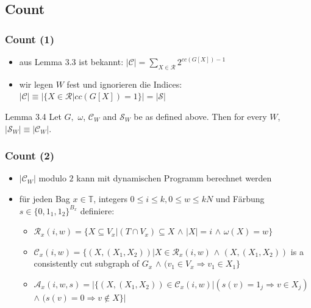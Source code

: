 \documentclass{beamer}
\begin{document}
\subsection{Count}
\begin{frame}
\frametitle{Count (1)}
\begin{itemize}
\item aus Lemma 3.3 ist bekannt: $|\mathcal{C}|=\sum_{X \in \mathcal{R}} 2^{cc(G[X])-1}$
\item wir legen $W$ fest und ignorieren die Indices: $|\mathcal{C}| \equiv |\{X \in \mathcal{R} |cc(G[X]) = 1\}| = |\mathcal{S}|$
\end{itemize}
\begin{block}{Lemma 3.4}
Let $G,$ $\omega$, $\mathcal{C}_W$ and $\mathcal{S}_W$ be as defined above. Then for every $W$, $|\mathcal{S}_W| \equiv |\mathcal{C}_W|$.
\end{block}
\end{frame}
\begin{frame}
\frametitle{Count (2)}
\begin{itemize}
\item $|\mathcal{C}_W|$ modulo $2$ kann mit dynamischen Programm berechnet werden
\item für jeden Bag $x \in \mathbb{T}$, integers $0 \leq i \leq k,0 \leq w \leq kN$ und Färbung $s \in \{0,1_1,1_2 \}^{B_x}$ definiere:
\begin{itemize}
\item $\mathcal{R}_x(i,w)=\{X \subseteq V_x | (T \cap V_x) \subseteq X$ $\wedge$ $|X| = i$ $\wedge$ $\omega (X) = w \}$
\item $\mathcal{C}_x (i,w) =\{ (X,(X_1,X_2)) | X \in \mathcal{R}_x(i,w)$ $\wedge$ $(X,(X_1,X_2))$ is a consistently cut subgraph of $G_x$ $\wedge$ $(v_1 \in V_x \Rightarrow v_1 \in X_1 \} $
\item $\mathcal{A}_x(i,w,s)=| \{ (X,(X_1,X_2)) \in \mathcal{C}_x(i,w) | (s(v) = 1_j \Rightarrow v \in X_j)$ $\wedge$ $(s(v)=0 \Rightarrow v \notin X \} |$

\end{itemize}
\end{itemize}
\end{frame}
\end{document}
